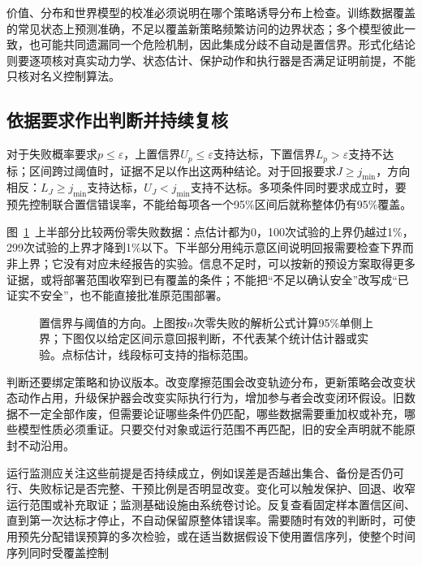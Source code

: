 价值、分布和世界模型的校准必须说明在哪个策略诱导分布上检查。训练数据覆盖的常见状态上预测准确，不足以覆盖新策略频繁访问的边界状态；多个模型彼此一致，也可能共同遗漏同一个危险机制，因此集成分歧不自动是置信界。形式化结论则要逐项核对真实动力学、状态估计、保护动作和执行器是否满足证明前提，不能只核对名义控制算法。

\subsection{依据要求作出判断并持续复核}
\label{sec:rl-trustworthy-decision}

对于失败概率要求$p\leq\varepsilon$，上置信界$U_p\leq\varepsilon$支持达标，下置信界$L_p>\varepsilon$支持不达标；区间跨过阈值时，证据不足以作出这两种结论。对于回报要求$J\geq j_{\min}$，方向相反：$L_J\geq j_{\min}$支持达标，$U_J<j_{\min}$支持不达标。多项条件同时要求成立时，要预先控制联合置信错误率，不能给每项各一个95\%区间后就称整体仍有95\%覆盖。

图~\ref{fig:rl-trustworthy-intervals}~上半部分比较两份零失败数据：点估计都为0，100次试验的上界仍越过1\%，299次试验的上界才降到1\%以下。下半部分用纯示意区间说明回报需要检查下界而非上界；它没有对应未经报告的实验。信息不足时，可以按新的预设方案取得更多证据，或将部署范围收窄到已有覆盖的条件；不能把“不足以确认安全”改写成“已证实不安全”，也不能直接批准原范围部署。

\begin{figure}[t]
  \centering
  
  \caption{置信界与阈值的方向。上图按$n$次零失败的解析公式计算95\%单侧上界；下图仅以给定区间示意回报判断，不代表某个统计估计器或实验。点标估计，线段标可支持的指标范围。}
  \label{fig:rl-trustworthy-intervals}
\end{figure}

判断还要绑定策略和协议版本。改变摩擦范围会改变轨迹分布，更新策略会改变状态动作占用，升级保护器会改变实际执行行为，增加参与者会改变闭环假设。旧数据不一定全部作废，但需要论证哪些条件仍匹配，哪些数据需要重加权或补充，哪些模型性质必须重证。只要交付对象或运行范围不再匹配，旧的安全声明就不能原封不动沿用。

运行监测应关注这些前提是否持续成立，例如误差是否越出集合、备份是否仍可行、失败标记是否完整、干预比例是否明显改变。变化可以触发保护、回退、收窄运行范围或补充取证；监测基础设施由系统卷讨论。反复查看固定样本置信区间、直到第一次达标才停止，不自动保留原整体错误率。需要随时有效的判断时，可使用预先分配错误预算的多次检验，或在适当数据假设下使用置信序列，使整个时间序列同时受覆盖控制

